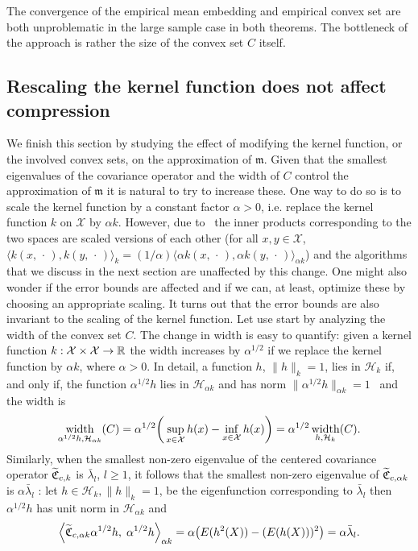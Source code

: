 \documentclass[10pt]{amsart}
\theoremstyle{definition}\newtheorem{defi}[theo]{Definition}\newtheorem{rema}[theo]{Remark}\newtheorem{exam}[theo]{Example}\newtheorem{exem}[theo]{Example}\newtheorem{nota}[theo]{Notation}
\theoremstyle{remark}
\DeclareMathOperator{\diam}{width}
\newcommand{\R}{\mathbb{R}}
\newcommand{\X}{\mathcal{X}}
\newcommand{\cH}{\mathcal{H}}
\newcommand{\fkC}{\mathfrak{C}}
\newcommand{\Cov}{\tilde{\fkC}}
\newcommand{\mean}{\mathfrak{m}}
\let\oldtilde\tilde
\renewcommand*{\tilde}[1]{\mathchoice{\widetilde{#1}}{\widetilde{#1}}{\oldtilde{#1}}{\oldtilde{#1}}}
\renewcommand*{\to}{\mathchoice{\longrightarrow}{\rightarrow}{\rightarrow}{\rightarrow}}
\let\originalleft\left
\let\originalright\right
\renewcommand{\left}{\mathopen{}\mathclose\bgroup\originalleft}
\renewcommand{\right}{\aftergroup\egroup\originalright}
\begin{document}
The convergence of the empirical mean embedding and empirical convex set are both unproblematic in the large sample case in both theorems. The bottleneck of the approach is rather the size of the convex set $C$ itself.

\subsection{Rescaling the kernel function does not affect compression} We finish this section by studying the effect of modifying the kernel function, or the involved convex sets, on the approximation of $\mean$. Given that the smallest eigenvalues of the covariance operator and the width of $C$ control the approximation of $\mean$ it is natural to try to increase these. One way to do so is to scale the kernel function by a constant factor $\alpha > 0$, i.e. replace the kernel function $k$ on $\X$ by $\alpha k$. However, due to~\cite[Proposition~5.20]{PAUL16} the inner products corresponding to the two spaces are scaled versions of each other (for all $x,y \in \X$, $\langle k(x,\,\cdot\,), k(y,\,\cdot\,) \rangle_k = (1/\alpha) \langle \alpha k(x,\,\cdot\,), \alpha k(y,\,\cdot\,) \rangle_{\alpha k}$) and the algorithms that we discuss in the next section are unaffected by this change. One might also wonder if the error bounds are affected and if we can, at least, optimize these by choosing an appropriate scaling. It turns out that the error bounds are also invariant to the scaling of the kernel function. Let use start by analyzing the width of the convex set $C$. The change in width is easy to quantify: given a kernel function $k: \X \times \X \to \R$ the width increases by $\alpha^{1/2}$ if we replace the kernel function by $\alpha k$, where $\alpha >0$. In detail, a function $h$, $\|h\|_k=1$, lies in $\cH_k$ if, and only if, the function $\alpha^{1/2} h$ lies in $\cH_{\alpha k}$ and has norm $\|\alpha^{1/2} h\|_{\alpha k} = 1$~\cite[Proposition~5.20]{PAUL16} and the width is
\[
\diam_{\alpha^{1/2} h, \cH_{\alpha k}}(C) = \alpha^{1/2}\left(\,\sup_{x \in \X} h(x) - \inf_{x \in \X} h(x)\right) = \alpha^{1/2} \diam_{h, \cH_k}(C).
\]
Similarly, when the smallest non-zero eigenvalue of the centered covariance operator $\Cov_{c,k}$ is $\bar \lambda_l$, $l\geq 1$, it follows that the smallest non-zero eigenvalue of $\Cov_{c,\alpha k}$ is $\alpha \bar \lambda_l$ : let $h \in \cH_k, \|h\|_k=1$, be the eigenfunction corresponding to $\bar \lambda_l$ then $\alpha^{1/2} h$ has unit norm in $\cH_{\alpha k}$ and
\[
\left\langle \Cov_{c,\alpha k} \alpha^{1/2} h,\; \alpha^{1/2} h \right\rangle_{\alpha k} = \alpha \left(E(h^2(X)) - (E(h(X)))^2\right) = \alpha \bar \lambda_l.
\]
\end{document}
